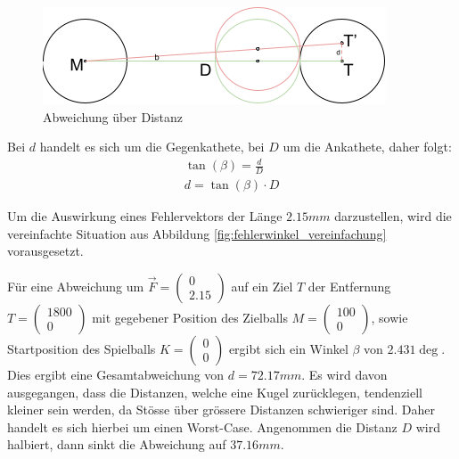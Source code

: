 \begin{figure}[h!]
    \begin{center}
        \includegraphics[width=0.4\linewidth]{../common/07_appendix/resources/04_abweichung.png}
    \end{center}
    \caption{Abweichung über Distanz}
    \label{fig:abweichung_ueber_distanz}
\end{figure}

Bei $d$ handelt es sich um die Gegenkathete, bei $D$ um die Ankathete, daher folgt:
\begin{align}
    \tan(\beta) = \frac{d}{D}\\
    d = \tan(\beta) \cdot D
\end{align}

Um die Auswirkung eines Fehlervektors der Länge $2.15mm$ darzustellen, wird die vereinfachte Situation aus Abbildung
\ref{fig:fehlerwinkel_vereinfachung} vorausgesetzt.

Für eine Abweichung um $\vec{F} = \begin{pmatrix}0\\2.15\end{pmatrix}$ auf ein Ziel $T$ der
Entfernung $T = \begin{pmatrix}1800\\0\end{pmatrix}$ mit gegebener Position des Zielballs $M = \begin{pmatrix}100\\0\end{pmatrix}$,
sowie Startposition des Spielballs $K = \begin{pmatrix}0\\0\end{pmatrix}$
ergibt sich ein Winkel $\beta$ von $2.431\deg$. Dies ergibt eine Gesamtabweichung von $d = 72.17mm$.
Es wird davon ausgegangen, dass die Distanzen, welche eine
Kugel zurücklegen, tendenziell kleiner sein werden, da Stösse über grössere Distanzen schwieriger sind.
Daher handelt es sich hierbei um einen Worst-Case.
Angenommen die Distanz $D$ wird halbiert, dann sinkt die Abweichung auf $37.16mm$.

